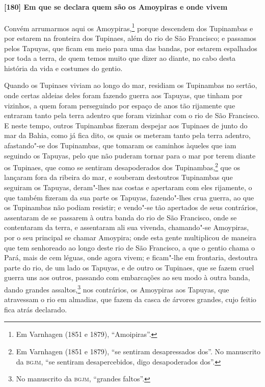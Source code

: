 \paragraph{[180] Em que se declara quem são os Amoypiras e onde vivem}\quad
Convém arrumarmos aqui os Amoypiras,\footnote{ Em Varnhagen (1851 e 1879), ``Amoipiras''.}
porque descendem dos Tupinambas e por estarem na fronteira dos Tupinaes, além do rio de
São Francisco; e passamos pelos Tapuyas, que ficam em meio para uma das bandas, por
estarem espalhados por toda a terra, de quem temos muito que dizer ao diante, no cabo
desta história da vida e costumes do gentio.

Quando os Tupinaes viviam ao longo do mar, residiam os Tupinambas no sertão, onde certas
aldeias deles foram fazendo guerra aos Tapuyas, que tinham por vizinhos, a quem foram
perseguindo por espaço de anos tão rijamente que entraram tanto pela terra adentro que
foram vizinhar com o rio de São Francisco. E neste tempo, outros Tupinambas fizeram
despejar aos Tupinaes de junto do mar da Bahia, como já fica dito, os quais os meteram
tanto pela terra adentro, afastando"-se dos Tupinambas, que tomaram os caminhos àqueles que
iam seguindo os Tapuyas, pelo que não puderam tornar para o mar por terem diante os
Tupinaes, que como se sentiram desapoderados dos Tupinambas,\footnote{ Em Varnhagen (1851
e 1879), ``se sentiram desapressados dos''. No manuscrito da \textsc{bgjm}, ``se sentiram
desapercebidos, digo desapoderados dos''.} que os lançaram fora da ribeira do mar, e
souberam destoutros Tupinambas que seguiram os Tapuyas, deram"-lhes nas costas e apertaram
com eles rijamente, o que também fizeram da sua parte os Tapuyas, fazendo"-lhes crua
guerra, ao que os Tupinambas não podiam resistir; e vendo"-se tão apertados de seus
contrários, assentaram de se passarem à outra banda do rio de São Francisco, onde se
contentaram da terra, e assentaram ali sua vivenda, chamando"-se Amoypiras, por o seu
principal se chamar Amoypira; onde esta gente multiplicou de maneira que tem senhoreado ao
longo deste rio de São Francisco, a que o gentio chama o Pará, mais de cem léguas, onde
agora vivem; e ficam"-lhe em frontaria, destoutra parte do rio, de um lado os Tapuyas, e de
outro os Tupinaes, que se fazem cruel guerra uns aos outros, passando com embarcações ao
seu modo à outra banda, dando grandes assaltos,\footnote{ No manuscrito da \textsc{bgjm},
``grandes faltos''.} nos contrários, os Amoypiras aos Tapuyas, que atravessam o rio em
almadias, que fazem da casca de árvores grandes, cujo feitio fica atrás declarado.

